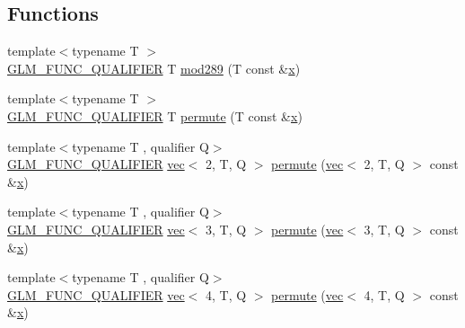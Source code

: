\subsection*{Functions}
\begin{DoxyCompactItemize}
\item 
{\footnotesize template$<$typename T $>$ }\\\hyperlink{setup_8hpp_a33fdea6f91c5f834105f7415e2a64407}{G\+L\+M\+\_\+\+F\+U\+N\+C\+\_\+\+Q\+U\+A\+L\+I\+F\+I\+ER} T \hyperlink{namespaceglm_1_1detail_a9968154b610b2b78f492b2f7babd728c}{mod289} (T const \&\hyperlink{_s_d_l__opengl_8h_ad0e63d0edcdbd3d79554076bf309fd47}{x})
\item 
{\footnotesize template$<$typename T $>$ }\\\hyperlink{setup_8hpp_a33fdea6f91c5f834105f7415e2a64407}{G\+L\+M\+\_\+\+F\+U\+N\+C\+\_\+\+Q\+U\+A\+L\+I\+F\+I\+ER} T \hyperlink{namespaceglm_1_1detail_adce908e01ac22b5e55c29bacbf6a37a5}{permute} (T const \&\hyperlink{_s_d_l__opengl_8h_ad0e63d0edcdbd3d79554076bf309fd47}{x})
\item 
{\footnotesize template$<$typename T , qualifier Q$>$ }\\\hyperlink{setup_8hpp_a33fdea6f91c5f834105f7415e2a64407}{G\+L\+M\+\_\+\+F\+U\+N\+C\+\_\+\+Q\+U\+A\+L\+I\+F\+I\+ER} \hyperlink{structglm_1_1vec}{vec}$<$ 2, T, Q $>$ \hyperlink{namespaceglm_1_1detail_a442b75a1f3ea4e2660ce0047245581ee}{permute} (\hyperlink{structglm_1_1vec}{vec}$<$ 2, T, Q $>$ const \&\hyperlink{_s_d_l__opengl_8h_ad0e63d0edcdbd3d79554076bf309fd47}{x})
\item 
{\footnotesize template$<$typename T , qualifier Q$>$ }\\\hyperlink{setup_8hpp_a33fdea6f91c5f834105f7415e2a64407}{G\+L\+M\+\_\+\+F\+U\+N\+C\+\_\+\+Q\+U\+A\+L\+I\+F\+I\+ER} \hyperlink{structglm_1_1vec}{vec}$<$ 3, T, Q $>$ \hyperlink{namespaceglm_1_1detail_aa0f0fcedee25b7de5b7174df40fef4e4}{permute} (\hyperlink{structglm_1_1vec}{vec}$<$ 3, T, Q $>$ const \&\hyperlink{_s_d_l__opengl_8h_ad0e63d0edcdbd3d79554076bf309fd47}{x})
\item 
{\footnotesize template$<$typename T , qualifier Q$>$ }\\\hyperlink{setup_8hpp_a33fdea6f91c5f834105f7415e2a64407}{G\+L\+M\+\_\+\+F\+U\+N\+C\+\_\+\+Q\+U\+A\+L\+I\+F\+I\+ER} \hyperlink{structglm_1_1vec}{vec}$<$ 4, T, Q $>$ \hyperlink{namespaceglm_1_1detail_a3943594f7c636dd1d021cd23f4e22441}{permute} (\hyperlink{structglm_1_1vec}{vec}$<$ 4, T, Q $>$ const \&\hyperlink{_s_d_l__opengl_8h_ad0e63d0edcdbd3d79554076bf309fd47}{x})
\item 

\end{DoxyCompactItemize}
